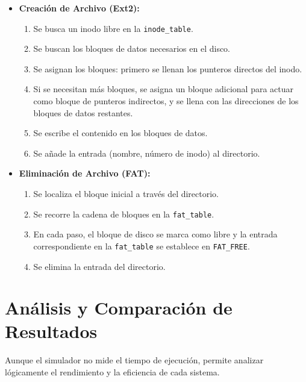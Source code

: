 \documentclass[12pt, a4paper]{article}
\begin{document}
\begin{itemize}
\begin{itemize}
    \item \textbf{Creación de Archivo (Ext2):}
    \begin{enumerate}
        \item Se busca un inodo libre en la \texttt{inode\_table}.
        \item Se buscan los bloques de datos necesarios en el disco.
        \item Se asignan los bloques: primero se llenan los punteros directos del inodo.
        \item Si se necesitan más bloques, se asigna un bloque adicional para actuar como bloque de punteros indirectos, y se llena con las direcciones de los bloques de datos restantes.
        \item Se escribe el contenido en los bloques de datos.
        \item Se añade la entrada (nombre, número de inodo) al directorio.
    \end{enumerate}
        
    \item \textbf{Eliminación de Archivo (FAT):}
    \begin{enumerate}
        \item Se localiza el bloque inicial a través del directorio.
        \item Se recorre la cadena de bloques en la \texttt{fat\_table}.
        \item En cada paso, el bloque de disco se marca como libre y la entrada correspondiente en la \texttt{fat\_table} se establece en \texttt{FAT\_FREE}.
        \item Se elimina la entrada del directorio.
    \end{enumerate}
\end{itemize}

\section{Análisis y Comparación de Resultados}

Aunque el simulador no mide el tiempo de ejecución, permite analizar lógicamente el rendimiento y la eficiencia de cada sistema.


\end{itemize}
\end{document}
